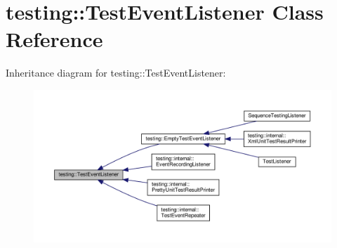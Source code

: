 \hypertarget{classtesting_1_1_test_event_listener}{}\section{testing\+:\+:Test\+Event\+Listener Class Reference}
\label{classtesting_1_1_test_event_listener}


Inheritance diagram for testing\+:\+:Test\+Event\+Listener\+:
\nopagebreak
\begin{figure}[H]
\begin{center}
\leavevmode
\includegraphics[width=350pt]{classtesting_1_1_test_event_listener__inherit__graph}
\end{center}
\end{figure}
